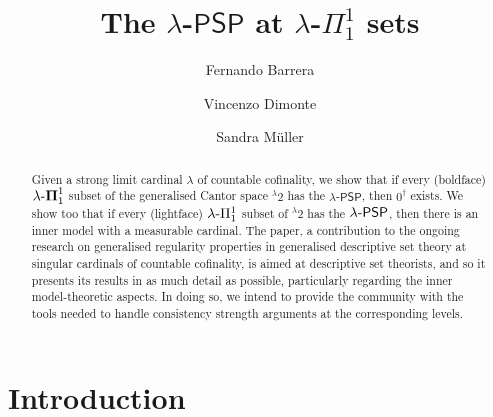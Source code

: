 \documentclass{amsart}
\numberwithin{equation}{section}
\def\hyp{{\hbox{-}}}
\theoremstyle{definition}
\theoremstyle{remark}
\begin{document}
	
	
	
	
	\title{The $\lambda$-$\mathsf{PSP}$ at $\lambda$-$\Pi^1_1$ sets}
	
	\author{Fernando Barrera}
	\address[Fernando Barrera]
	{Institut f\"ur Diskrete Mathematik und Geometrie, Technische Universit\"at Wien, Wiedner Hauptstra{\ss}e 8-10/104, 1040 Vienna, Austria}
	
	\author{Vincenzo Dimonte}
	\address[Vincenzo Dimonte]
	{GNSAGA INdAM and Universit\`a degli Studi di Udine, Via delle Scienze 206, 33100 Udine, Italy}
	
	\author{Sandra Müller}
	\address[Sandra Müller]
	{Institut f\"ur Diskrete Mathematik und Geometrie, Technische Universit\"at Wien, Wiedner Hauptstra{\ss}e 8-10/104, 1040 Vienna, Austria}

    \begin{abstract}
	Given a strong limit cardinal $\lambda$ of countable cofinality, we show that if every (boldface) $\lambda\hyp\boldsymbol{\Pi}^1_1$ subset of the generalised Cantor space ${}^{\lambda}2$ has the $\lambda$-$\mathsf{PSP}$, then $0^\dagger$ exists. We show too that if every (lightface) $\lambda\hyp\Pi^1_1$ subset of ${}^\lambda 2$ has the $\lambda\hyp\mathsf{PSP}$, then there is an inner model with a measurable cardinal. The paper, a contribution to the ongoing research on generalised regularity properties in generalised descriptive set theory at singular cardinals of countable cofinality, is aimed at descriptive set theorists, and so it presents its results in as much detail as possible, particularly regarding the inner model-theoretic aspects. In doing so, we intend to provide the community with the tools needed to handle consistency strength arguments at the corresponding levels.
\end{abstract}

    \maketitle

    \section{Introduction}
\end{document}
